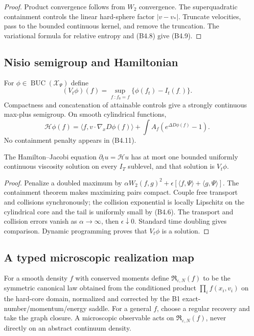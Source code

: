 \begin{proof}
Product convergence follows from $W_2$ convergence.  The superquadratic
containment controls the linear hard-sphere factor $|v-v_*|$.  Truncate
velocities, pass to the bounded continuous kernel, and remove the truncation.
The variational formula for relative entropy and (B4.8) give (B4.9).
\end{proof}

\subsection{Nisio semigroup and Hamiltonian}

For $\phi\in\operatorname{BUC}(\mathcal X_\Psi)$ define
\[
 (V_t\phi)(f)
 =\sup_{f_\cdot:f_0=f}\{\phi(f_t)-I_t(f_\cdot)\}.          \tag{B4.10}
\]
Compactness and concatenation of attainable controls give a strongly
continuous max-plus semigroup.  On smooth cylindrical functions,
\[
 \mathcal H\phi(f)
 =\langle f,v\cdot\nabla_xD\phi(f)\rangle
 +\int A_f(e^{\Delta D\phi(f)}-1).                        \tag{B4.11}
\]
No containment penalty appears in (B4.11).

\begin{theorem}
\label{thm:r27-b4-comparison}
The Hamilton--Jacobi equation
$\partial_tu=\mathcal Hu$ has at most one bounded uniformly continuous
viscosity solution on every $I_T$ sublevel, and that solution is $V_t\phi$.
\end{theorem}

\begin{proof}
Penalize a doubled maximum by
$\alpha W_2(f,g)^2+\epsilon[\langle f,\Psi\rangle+
\langle g,\Psi\rangle]$.  The containment theorem makes maximizing pairs
compact.  Couple free transport and collisions synchronously; the collision
exponential is locally Lipschitz on the cylindrical core and the tail is
uniformly small by (B4.6).  The transport and collision errors vanish as
$\alpha\to\infty$, then $\epsilon\downarrow0$.  Standard time doubling gives
comparison.  Dynamic programming proves that $V_t\phi$ is a solution.
\end{proof}

\subsection{A typed microscopic realization map}

For a smooth density $f$ with conserved moments define
$\mathfrak R_{\varepsilon,N}(f)$ to be the symmetric canonical law obtained
from the conditioned product $\prod_i f(x_i,v_i)$ on the hard-core domain,
normalized and corrected by the B1 exact-number/momentum/energy saddle.  For a
general $f$, choose a regular recovery and take the graph closure.  A
microscopic observable acts on $\mathfrak R_{\varepsilon,N}(f)$, never directly
on an abstract continuum density.

